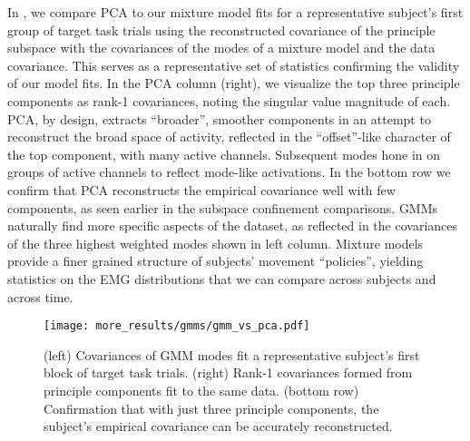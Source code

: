 \documentclass[../main.tex]{subfiles}
\begin{document}
In , we compare PCA to our mixture model fits for a representative subject's first group of target task trials using the reconstructed covariance of the principle subspace with the covariances of the modes of a mixture model and the data covariance. This serves as a representative set of statistics confirming the validity of our model fits. In the PCA column (right), we visualize the top three principle components as rank-1 covariances, noting the singular value magnitude of each. PCA, by design, extracts ``broader'', smoother components in an attempt to reconstruct the broad space of activity, reflected in the ``offset''-like character of the top component, with many active channels. Subsequent modes hone in on groups of active channels to reflect mode-like activations. In the bottom row we confirm that PCA reconstructs the empirical covariance well with few components, as seen earlier in the subspace confinement comparisons. GMMs naturally find more specific aspects of the dataset, as reflected in the covariances of the three highest weighted modes shown in left column. Mixture models provide a finer grained structure of subjects' movement ``policies'', yielding statistics on the EMG distributions that we can compare across subjects and across time. 



\begin{figure}[!htb]
  \centering
    \texttt{[image: more\_results/gmms/gmm\_vs\_pca.pdf]}
    \caption[GMM and PCA covariances]{(left) Covariances of GMM modes fit a representative subject's first block of target task trials. (right) Rank-1 covariances formed from principle components fit to the same data. (bottom row) Confirmation that with just three principle components, the subject's empirical covariance can be accurately reconstructed.}\label{fig:gmm_vs_pca}
\end{figure}
\end{document}
